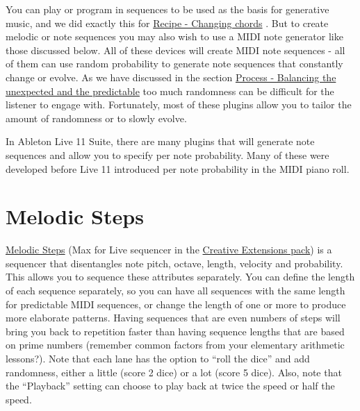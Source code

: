 \documentclass[
  12pt,
  letterpaper,
  oneside,
  open=any]{scrbook}
\begin{document}
\begin{tcolorbox}[enhanced jigsaw, opacitybacktitle=0.6, rightrule=.15mm, leftrule=.75mm, opacityback=0, toptitle=1mm, toprule=.15mm, breakable, titlerule=0mm, colback=white, bottomtitle=1mm, title=\textcolor{quarto-callout-tip-color}{\faLightbulb}\hspace{0.5em}{Key idea}, coltitle=black, left=2mm, colframe=quarto-callout-tip-color-frame, bottomrule=.15mm, colbacktitle=quarto-callout-tip-color!10!white, arc=.35mm]

You can play or program in sequences to be used as the basis for
generative music, and we did exactly this for
\hyperref[Chapter-001-Recipe-Changing_Chords]{Recipe - Changing chords}
. But to create melodic or note sequences you may also wish to use a
MIDI note generator like those discussed below. All of these devices
will create MIDI note sequences - all of them can use random probability
to generate note sequences that constantly change or evolve. As we have
discussed in the section
\hyperref[Chapter-009-Process-Balance_unexpected_and_predictable]{Process
- Balancing the unexpected and the predictable} too much randomness can
be difficult for the listener to engage with. Fortunately, most of these
plugins allow you to tailor the amount of randomness or to slowly
evolve.

\end{tcolorbox}

In Ableton Live 11 Suite, there are many plugins that will generate note
sequences and allow you to specify per note probability. Many of these
were developed before Live 11 introduced per note probability in the
MIDI piano roll.

\section{Melodic Steps}\label{melodic-steps}

\href{https://www.youtube.com/watch?v=ev2GgU1D8jw}{Melodic Steps} (Max
for Live sequencer in the
\href{https://www.ableton.com/en/packs/creative-extensions/}{Creative
Extensions pack}) is a sequencer that disentangles note pitch, octave,
length, velocity and probability. This allows you to sequence these
attributes separately. You can define the length of each sequence
separately, so you can have all sequences with the same length for
predictable MIDI sequences, or change the length of one or more to
produce more elaborate patterns. Having sequences that are even numbers
of steps will bring you back to repetition faster than having sequence
lengths that are based on prime numbers (remember common factors from
your elementary arithmetic lessons?). Note that each lane has the option
to ``roll the dice'' and add randomness, either a little (score 2 dice)
or a lot (score 5 dice). Also, note that the ``Playback'' setting can
choose to play back at twice the speed or half the speed.
\end{document}
